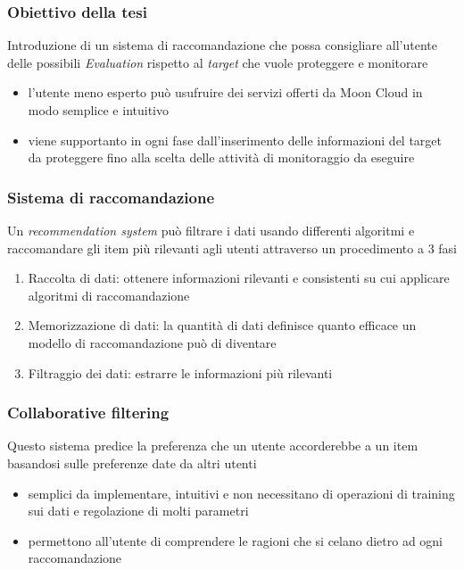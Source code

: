 \begin{frame}
    \frametitle{Obiettivo della tesi}
    Introduzione di un \alert{sistema di raccomandazione} che possa consigliare all'utente delle possibili \textit{Evaluation} rispetto 
    al \textit{target} che vuole proteggere e monitorare
    \begin{itemize}
        \item l'utente meno esperto può usufruire dei servizi offerti da Moon Cloud in modo \alert{semplice} e \alert{intuitivo} 
        \item viene supportanto in ogni fase dall'inserimento delle informazioni del target da proteggere fino alla scelta delle 
        attività di monitoraggio da eseguire
    \end{itemize}
\end{frame}

\begin{frame}
    \frametitle{Sistema di raccomandazione}
    Un \textit{recommendation system} può filtrare i dati usando differenti algoritmi e raccomandare gli item più rilevanti agli utenti attraverso 
    un procedimento a 3 fasi
    \begin{enumerate}
        \item \alert{Raccolta di dati}: ottenere informazioni rilevanti e consistenti su cui applicare algoritmi di raccomandazione
        \item \alert{Memorizzazione di dati}: la quantità di dati definisce quanto efficace un modello di raccomandazione può di diventare
        \item \alert{Filtraggio dei dati}: estrarre le informazioni più rilevanti
    \end{enumerate}
\end{frame}

\begin{frame}
    \frametitle{Collaborative filtering}
    Questo sistema predice la preferenza che un utente accorderebbe a un item basandosi sulle preferenze date da altri utenti
    \begin{itemize}
        \item \alert{semplici da implementare}, \alert{intuitivi} e non necessitano di operazioni di training sui dati e 
        regolazione di molti parametri
        \item permettono all'utente di comprendere le ragioni che si celano dietro ad ogni raccomandazione
    \end{itemize}
\end{frame}

